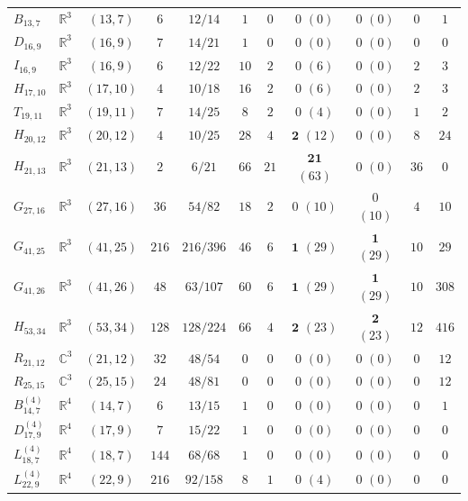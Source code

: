 \documentclass[aps,pra,reprint,superscriptaddress,longbibliography,nofootinbib,floatfix,10pt]{revtex4-2}
\theoremstyle{definition}\newtheorem{definition}[theorem]{Definition}
\theoremstyle{remark}\newtheorem{remark}[theorem]{Remark}
\newcommand{\C}{\mathbb C}\newcommand{\R}{\mathbb R}\newcommand{\Q}{\mathbb Q}
\begin{document}
\begin{table}[!htbp]
\begin{ruledtabular}
\begin{tabular}{llccccccccc}
$B_{13,7}$ & $\R^3$ & $(13,7)$ & $6$ & $12/14$ & $1$ & $0$ & $0$ $(0)$ & $0$ $(0)$ & $0$ & $1$\\
$D_{16,9}$ & $\R^3$ & $(16,9)$ & $7$ & $14/21$ & $1$ & $0$ & $0$ $(0)$ & $0$ $(0)$ & $0$ & $0$\\
$I_{16,9}$ & $\R^3$ & $(16,9)$ & $6$ & $12/22$ & $10$ & $2$ & $0$ $(6)$ & $0$ $(0)$ & $2$ & $3$\\
$H_{17,10}$ & $\R^3$ & $(17,10)$ & $4$ & $10/18$ & $16$ & $2$ & $0$ $(6)$ & $0$ $(0)$ & $2$ & $3$\\
$T_{19,11}$ & $\R^3$ & $(19,11)$ & $7$ & $14/25$ & $8$ & $2$ & $0$ $(4)$ & $0$ $(0)$ & $1$ & $2$\\
$H_{20,12}$ & $\R^3$ & $(20,12)$ & $4$ & $10/25$ & $28$ & $4$ & $\mathbf{2}$ $(12)$ & $0$ $(0)$ & $8$ & $24$\\
$H_{21,13}$ & $\R^3$ & $(21,13)$ & $2$ & $6/21$ & $66$ & $21$ & $\mathbf{21}$ $(63)$ & $0$ $(0)$ & $36$ & $0$\\
$G_{27,16}$ & $\R^3$ & $(27,16)$ & $36$ & $54/82$ & $18$ & $2$ & $0$ $(10)$ & $0$ $(10)$ & $4$ & $10$\\
$G_{41,25}$ & $\R^3$ & $(41,25)$ & $216$ & $216/396$ & $46$ & $6$ & $\mathbf{1}$ $(29)$ & $\mathbf{1}$ $(29)$ & $10$ & $29$\\
$G_{41,26}$ & $\R^3$ & $(41,26)$ & $48$ & $63/107$ & $60$ & $6$ & $\mathbf{1}$ $(29)$ & $\mathbf{1}$ $(29)$ & $10$ & $308$\\
$H_{53,34}$ & $\R^3$ & $(53,34)$ & $128$ & $128/224$ & $66$ & $4$ & $\mathbf{2}$ $(23)$ & $\mathbf{2}$ $(23)$ & $12$ & $416$\\
$R_{21,12}$ & $\C^3$ & $(21,12)$ & $32$ & $48/54$ & $0$ & $0$ & $0$ $(0)$ & $0$ $(0)$ & $0$ & $12$\\
$R_{25,15}$ & $\C^3$ & $(25,15)$ & $24$ & $48/81$ & $0$ & $0$ & $0$ $(0)$ & $0$ $(0)$ & $0$ & $12$\\\hline
$B_{14,7}^{(4)}$ & $\R^4$ & $(14,7)$ & $6$ & $13/15$ & $1$ & $0$ & $0$ $(0)$ & $0$ $(0)$ & $0$ & $1$\\
$D_{17,9}^{(4)}$ & $\R^4$ & $(17,9)$ & $7$ & $15/22$ & $1$ & $0$ & $0$ $(0)$ & $0$ $(0)$ & $0$ & $0$\\
$L_{18,7}^{(4)}$ & $\R^4$ & $(18,7)$ & $144$ & $68/68$ & $1$ & $0$ & $0$ $(0)$ & $0$ $(0)$ & $0$ & $0$\\
$L_{22,9}^{(4)}$ & $\R^4$ & $(22,9)$ & $216$ & $92/158$ & $8$ & $1$ & $0$ $(4)$ & $0$ $(0)$ & $0$ & $0$\\
\end{tabular}
\end{ruledtabular}
\end{table}
\end{document}
